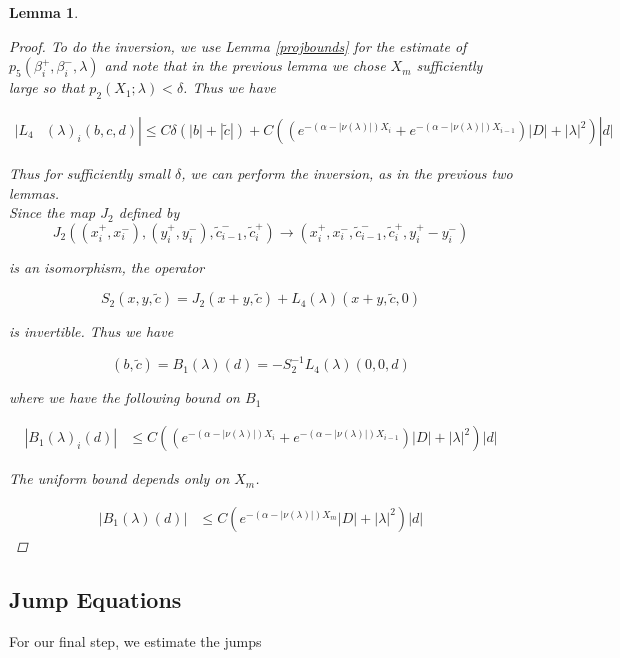 \documentclass[12pt]{article}
\newtheorem{lemma}{Lemma}
\begin{document}
\begin{lemma}
\begin{proof}
To do the inversion, we use Lemma \ref{projbounds} for the estimate of $p_5(\beta_i^+, \beta_i^-, \lambda)$ and note that in the previous lemma we chose $X_m$ sufficiently large so that $p_2(X_1; \lambda) < \delta$. Thus we have

\begin{align*}
|L_4&(\lambda)_i(b, c, d)| \leq C \delta (|b| + |\tilde{c}|) + C ( (e^{-(\alpha - |\nu(\lambda)|) X_i} + e^{-(\alpha - |\nu(\lambda)|) X_{i-1}})|D| + |\lambda|^2)|d|
\end{align*}

Thus for sufficiently small $\delta$, we can perform the inversion, as in the previous two lemmas.\\

Since the map $J_2$ defined by
\[
J_2( (x_i^+, x_i^-),(y_i^+, y_i^-), \tilde{c}_{i-1}^-, \tilde{c}_i^+ ) \rightarrow ( x_i^+, x_i^-, \tilde{c}_{i-1}^-, \tilde{c}_i^+, y_i^+ -  y_i^- )
\]

is an isomorphism, the operator

\[
S_2(x,y, \tilde{c}) = J_2(x+y, \tilde{c}) + L_4(\lambda)(x+y,\tilde{c}, 0)
\]

is invertible. Thus we have

\begin{equation}
(b,\tilde{c}) = B_1(\lambda)(d) = -S_2^{-1} L_4(\lambda)(0, 0, d)
\end{equation}

where we have the following bound on $B_1$

\begin{align*}
|B_1(\lambda)_i(d)| &\leq C ( (e^{-(\alpha - |\nu(\lambda)|) X_i} + e^{-(\alpha - |\nu(\lambda)|) X_{i-1}})|D| + |\lambda|^2 )|d|
\end{align*}

The uniform bound depends only on $X_m$. 

\begin{align*}
|B_1(\lambda)(d)| &\leq C ( e^{-(\alpha - |\nu(\lambda)|) X_m} |D| + |\lambda|^2 )|d|
\end{align*}

 
\end{proof}
\end{lemma}

\subsection{Jump Equations}

For our final step, we estimate the jumps
\end{document}
